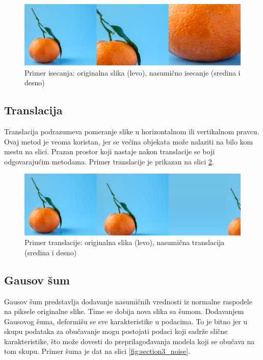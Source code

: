 \documentclass[12pt,oneside]{memoir}
\begin{document}
\begin{figure}[ht]
    \centering
    \includegraphics[width=1\textwidth]{matfmaster/glava3/crop.jpg}
    \caption{Primer isecanja: originalna slika (levo), nasumično isecanje (sredina i desno) \cite{unsplashOrange}}
    \label{fig:section3_cut}
\end{figure}

\subsection{Translacija}
Translacija podrazumeva pomeranje slike u horizontalnom ili vertikalnom pravcu. Ovaj metod je veoma koristan, jer se većina objekata može nalaziti na bilo kom mestu na slici. Prazan prostor koji nastaje nakon translacije se boji odgovarajućim metodama. Primer translacije je prikazan na slici \ref{fig:section3_trans}.

\begin{figure}[ht]
    \centering
    \includegraphics[width=1\textwidth]{matfmaster/glava3/translate.jpg}
    \caption{Primer translacije: originalna slika (levo), nasumična translacija (sredina i desno) \cite{unsplashOrange}}
    \label{fig:section3_trans}
\end{figure}

\subsection{Gausov šum}
Gausov šum predstavlja dodavanje nasumičnih vrednosti iz normalne raspodele na piksele originalne slike. Time se dobija nova slika sa šumom. Dodavanjem Gausovog šuma, deformišu se sve karakteristike u podacima. To je bitno jer u skupu podataka za obučavanje mogu postojati podaci koji sadrže slične karakteristike, što može dovesti do preprilagođavanja modela koji se obučava na tom skupu. Primer šuma je dat na slici \ref{fig:section3_noise}.
\end{document}
